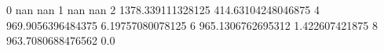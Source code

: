 0 nan nan
1 nan nan
2 1378.339111328125 414.63104248046875
4 969.9056396484375 6.19757080078125
6 965.1306762695312 1.422607421875
8 963.7080688476562 0.0

